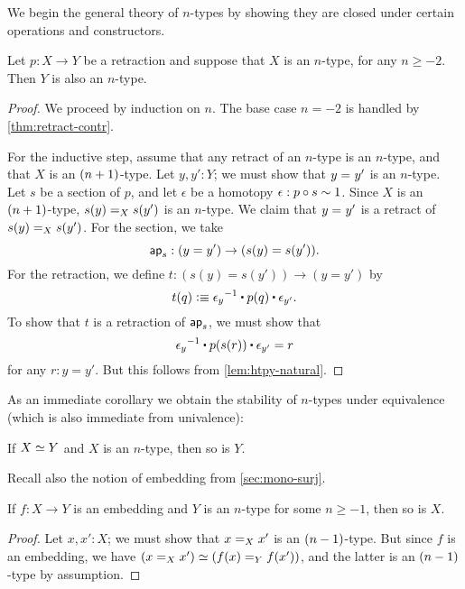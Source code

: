 We begin the general theory of $n$-types by showing they are closed under certain operations and constructors.

\begin{thm}\label{thm:h-level-retracts}
 Let $p : X \to Y$ be a retraction and suppose that $X$ is an $n$-type, for any $n\geq -2$.
 Then $Y$ is also an $n$-type.
\end{thm}

\begin{proof}
 We proceed by induction on $n$.
 The base case $n=-2$ is handled by \cref{thm:retract-contr}.

 For the inductive step, assume that any retract of an $n$-type is an $n$-type, and that $X$ is an $\nplusone$-type.
 Let $y, y' : Y$; we must show that $\id{y}{y'}$ is an $n$-type.
 Let $s$ be a section of $p$, and let $\epsilon$ be a homotopy $\epsilon : p \circ s \htpy 1$.
 Since $X$ is an $\nplusone$-type, $\id[X]{s(y)}{s(y')}$ is an $n$-type.
 We claim that $\id{y}{y'}$ is a retract of $\id[X]{s(y)}{s(y')}$.
 For the section, we take
 \[ \apfunc s : (y=y') \to (s(y)=s(y')). \]
 For the retraction, we define $t:(s(y)=s(y'))\to(y=y')$ by
 \[ t(q) \defeq  \opp{\epsilon_y} \ct \ap p q \ct \epsilon_{y'}.\]
 To show that $t$ is a retraction of $\apfunc s$, we must show that
 \[ \opp{\epsilon_y} \ct \ap p {\ap sr} \ct \epsilon_{y'} = r \]
 for any $r:y=y'$.
 But this follows from \cref{lem:htpy-natural}.
\end{proof}

As an immediate corollary we obtain the stability of $n$-types under equivalence (which is also immediate from univalence):

\begin{cor}\label{cor:preservation-hlevels-weq}
 If $\eqv{X}{Y}$ and $X$ is an $n$-type, then so is $Y$.
\end{cor}

Recall also the notion of embedding from \cref{sec:mono-surj}.

\begin{thm}\label{thm:isntype-mono}
  If $f:X\to Y$ is an embedding and $Y$ is an $n$-type for some $n\ge -1$, then so is $X$.
\end{thm}
\begin{proof}
  Let $x,x':X$; we must show that $\id[X]{x}{x'}$ is an $\nminusone$-type.
  But since $f$ is an embedding, we have $(\id[X]{x}{x'}) \eqvsym (\id[Y]{f(x)}{f(x')})$, and the latter is an $\nminusone$-type by assumption.
\end{proof}


